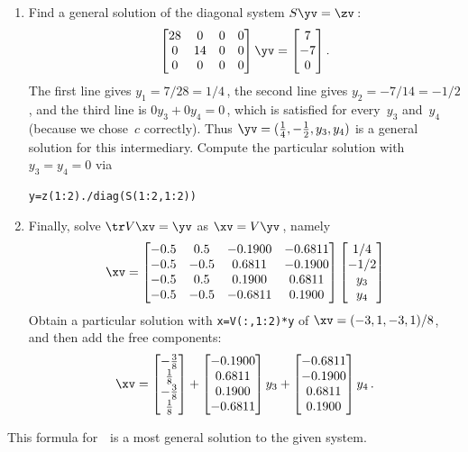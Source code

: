 \begin{example}
\begin{solution}
\begin{enumerate}
\item Find a general solution of the diagonal system \(S\yv=\zv\)\,:
\begin{equation*}
\begin{bmatrix}28&0&0&0
\\0&14&0&0
\\0&0&0&0 \end{bmatrix}\yv=\begin{bmatrix} 7\\-7\\0 \end{bmatrix}.
\end{equation*}
The first line gives \(y_1=7/28=1/4\)\,, the second line gives \(y_2=-7/14=-1/2\), and the third line is \(0y_3+0y_4=0\)\,, which is satisfied for every~\(y_3\) and~\(y_4\) (because we chose~\(c\) correctly).
Thus \(\yv=(\frac14,-\frac12,y_3,y_4)\) is a general solution for this intermediary.
Compute the particular solution with \(y_3=y_4=0\) via 
\begin{verbatim}
y=z(1:2)./diag(S(1:2,1:2))
\end{verbatim}

\item Finally, solve \(\tr V\xv=\yv\) as \(\xv=V\yv\)\,, namely
\begin{equation*}
\xv=\begin{bmatrix} -0.5&0.5&-0.1900&-0.6811
\\-0.5&-0.5&0.6811&-0.1900
\\-0.5&0.5&0.1900&0.6811
\\-0.5&-0.5&-0.6811&0.1900 \end{bmatrix}
\begin{bmatrix} 1/4\\-1/2\\y_3\\y_4 \end{bmatrix}
\end{equation*}
Obtain a particular solution with \verb|x=V(:,1:2)*y| of \(\xv=(-3,1,-3,1)/8\), and then add the free components:
\begin{equation*}
\xv=\begin{bmatrix} -\frac38\\\frac18\\-\frac38\\\frac18 \end{bmatrix}
+\begin{bmatrix}-0.1900
\\0.6811
\\0.1900
\\-0.6811 \end{bmatrix}y_3
+\begin{bmatrix} -0.6811
\\-0.1900
\\0.6811
\\0.1900 \end{bmatrix}y_4\,.
\end{equation*}
\end{enumerate}
This formula for~\xv\ is a most general solution to the given system. 
\end{solution}
\end{example}
